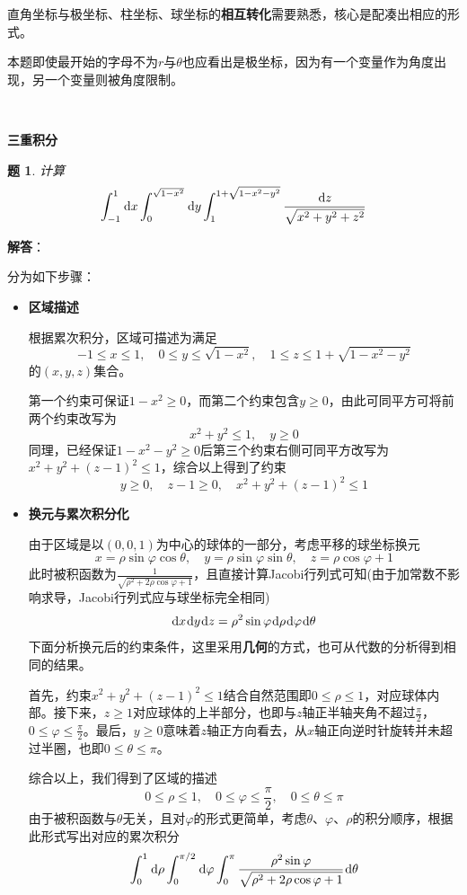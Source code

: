 \documentclass[a4paper,UTF8,fontset=windows,AutoFakeBold]{ctexart}
\newcommand*{\dr}{\hspace{0.07em}\mathrm{d}}
\newcommand*{\note}{\noindent *}
\theoremstyle{ex}
\newtheorem{exercise}{题}
\newcommand{\sol}[1]{{\vspace{5pt}\kaishu\noindent\textbf{解答}：\vspace{-3pt}
\begin{compactitem}
    \item[] #1
\end{compactitem}
}}
\begin{document}
\note 直角坐标与极坐标、柱坐标、球坐标的\textbf{相互转化}需要熟悉，核心是配凑出相应的形式。

\note 本题即使最开始的字母不为$r$与$\theta$也应看出是极坐标，因为有一个变量作为角度出现，另一个变量则被角度限制。

\

\noindent\textbf{三重积分}

\begin{framed}
\begin{exercise}
    计算
    $$\int_{-1}^1\dr x\int_0^{\sqrt{1-x^2}}\dr y\int_1^{1+\sqrt{1-x^2-y^2}}\frac{\dr z}{\sqrt{x^2+y^2+z^2}}$$
\end{exercise}
\sol{
    分为如下步骤：
    \begin{itemize}
        \item \textbf{区域描述}
    
        根据累次积分，区域可描述为满足
        $$-1\le x\le1,\quad 0\le y\le\sqrt{1-x^2},\quad1\le z\le1+\sqrt{1-x^2-y^2}$$
        的$(x,y,z)$集合。

        第一个约束可保证$1-x^2\ge0$，而第二个约束包含$y\ge0$，由此可同平方可将前两个约束改写为
        $$x^2+y^2\le1,\quad y\ge0$$
        同理，已经保证$1-x^2-y^2\ge0$后第三个约束右侧可同平方改写为$x^2+y^2+(z-1)^2\le1$，综合以上得到了约束
        $$y\ge0,\quad z-1\ge0,\quad x^2+y^2+(z-1)^2\le1$$

        \item \textbf{换元与累次积分化}
        
        由于区域是以$(0,0,1)$为中心的球体的一部分，考虑平移的球坐标换元
        $$x=\rho\sin\varphi\cos\theta,\quad y=\rho\sin\varphi\sin\theta,\quad z=\rho\cos\varphi+1$$
        此时被积函数为$\frac{1}{\sqrt{\rho^2+2\rho\cos\varphi+1}}$，且直接计算Jacobi行列式可知(由于加常数不影响求导，Jacobi行列式应与球坐标完全相同)
        $$\dr x\dr y\dr z=\rho^2\sin\varphi\dr\rho\dr\varphi\dr\theta$$
        下面分析换元后的约束条件，这里采用\textbf{几何}的方式，也可从代数的分析得到相同的结果。

        首先，约束$x^2+y^2+(z-1)^2\le1$结合自然范围即$0\le\rho\le1$，对应球体内部。接下来，$z\ge1$对应球体的上半部分，也即与$z$轴正半轴夹角不超过$\frac{\pi}{2}$，$0\le\varphi\le\frac{\pi}{2}$。最后，$y\ge0$意味着$z$轴正方向看去，从$x$轴正向逆时针旋转并未超过半圈，也即$0\le\theta\le\pi$。

        综合以上，我们得到了区域的描述
        $$0\le\rho\le1,\quad0\le\varphi\le\frac{\pi}{2},\quad0\le\theta\le\pi$$
        由于被积函数与$\theta$无关，且对$\varphi$的形式更简单，考虑$\theta$、$\varphi$、$\rho$的积分顺序，根据此形式写出对应的累次积分
        $$\int_0^1\dr\rho\int_0^{\pi/2}\dr\varphi\int_0^\pi\frac{\rho^2\sin\varphi}{\sqrt{\rho^2+2\rho\cos\varphi+1}}\dr\theta$$


\end{itemize}}
\end{framed}
\end{document}
